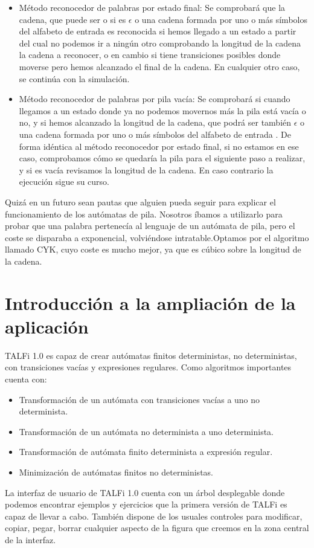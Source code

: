 \documentclass[12pt,a4paper,spanish]{book}
\begin{document}
\begin{itemize}

\item M\'etodo reconocedor de palabras por estado final: Se comprobar\'a que la cadena, que puede ser o si es $\epsilon$ o una cadena formada por uno o m\'as s\'imbolos del alfabeto de entrada es reconocida si hemos llegado a un estado a partir del cual no podemos ir a ning\'un otro comprobando la longitud de la cadena la cadena a reconocer, o en cambio si tiene transiciones posibles donde moverse pero hemos alcanzado el final de la cadena. En cualquier otro caso, se contin\'ua con la simulaci\'on.

\item M\'etodo reconocedor de palabras por pila vac\'ia: Se comprobar\'a si cuando llegamos a un estado donde ya no podemos movernos m\'as la pila est\'a vac\'ia o no, y si hemos alcanzado la longitud de la cadena, que podr\'a ser tambi\'en $\epsilon$ o una cadena formada por uno o m\'as s\'imbolos del alfabeto de entrada . De forma id\'entica al m\'etodo reconocedor por estado final, si no estamos en ese caso, comprobamos c\'omo se quedar\'ia la pila para el siguiente paso a realizar, y si es vac\'ia revisamos la longitud de la cadena. En caso contrario la ejecuci\'on sigue su curso.

\end{itemize}

Quiz\'a en un futuro sean pautas que alguien pueda seguir para explicar el funcionamiento de los aut\'omatas de pila. Nosotros \'ibamos a utilizarlo para probar que una palabra pertenec\'ia al lenguaje de un aut\'omata de pila, pero el coste se disparaba a exponencial, volvi\'endose intratable.Optamos por el algoritmo llamado CYK, cuyo coste es mucho mejor, ya que es c\'ubico sobre la longitud de la cadena.
\newpage
\section{Introducci\'on a la ampliaci\'on de la aplicaci\'on}


TALFi 1.0 es capaz de crear aut\'omatas finitos deterministas, no deterministas, con transiciones vac\'ias y expresiones regulares.
Como algoritmos importantes cuenta con:
\begin{itemize}
\item Transformaci\'on de un aut\'omata con transiciones vac\'ias a uno no determinista.
\item Transformaci\'on de un aut\'omata no determinista a uno determinista.
\item Transformaci\'on de aut\'omata finito determinista a expresi\'on regular.
\item Minimizaci\'on de aut\'omatas finitos no deterministas.\\
\end{itemize}
La interfaz de usuario de TALFi 1.0 cuenta con un \'arbol desplegable donde podemos encontrar ejemplos y ejercicios que la primera versi\'on de TALFi es capaz de llevar a cabo. Tambi\'en dispone de los usuales controles para modificar, copiar, pegar, borrar cualquier aspecto de la figura que creemos en la zona central de la interfaz.
\end{document}
